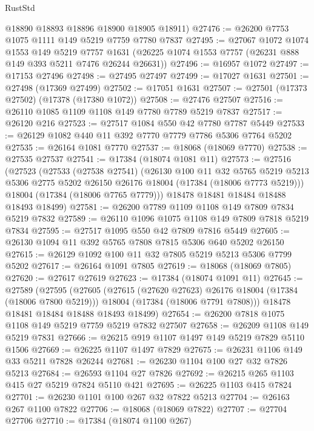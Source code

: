 \begin{lexlean}{RustStd}
\begin{coremodule}
      @18890
      @18893
      @18896
      @18900
      @18905
      @18911)
@27476 := @26200 @7753 @1075 @1111 @149 @5219 @7759 @7780 @7837
@27495 := @27067
    @1072
    @1074
    @1553
    @149
    @5219
    @7757
    @1631
    (@26225 @1074 @1553 @7757 (@26231 @888 @149 @393 @5211 @7476 @26244 @26631))
@27496 := @16957 @1072
@27497 := @17153 @27496
@27498 := @27495 @27497
@27499 := @17027 @1631
@27501 := @27498 (@17369 @27499)
@27502 := @17051 @1631
@27507 := @27501 (@17373 @27502) (@17378 (@17380 @1072))
@27508 := @27476 @27507
@27516 := @26110 @1085 @1109 @1108 @149 @7780 @7789 @5219 @7837
@27517 := @26120 @216
@27523 := @27517 @1084 @550 @42 @7780 @7787 @5449
@27533 := @26129 @1082 @440 @11 @392 @7770 @7779 @7786 @5306 @7764 @5202
@27535 := @26164 @1081 @7770
@27537 := @18068 (@18069 @7770)
@27538 := @27535 @27537
@27541 := @17384 (@18074 @1081 @11)
@27573 := @27516
    (@27523
      (@27533
        (@27538 @27541)
        (@26130
          @100
          @11
          @32
          @5765
          @5219
          @5213
          @5306
          @2775
          @5202
          @26150
          @26176
          @18004
          (@17384 (@18006 @7773 @5219)))
        @18004
        (@17384 (@18006 @7765 @7779)))
      @18478
      @18481
      @18484
      @18488
      @18493
      @18499)
@27581 := @26200 @7789 @1109 @1108 @149 @7809 @7834 @5219 @7832
@27589 := @26110 @1096 @1075 @1108 @149 @7809 @7818 @5219 @7834
@27595 := @27517 @1095 @550 @42 @7809 @7816 @5449
@27605 := @26130 @1094 @11 @392 @5765 @7808 @7815 @5306 @640 @5202 @26150
@27615 := @26129 @1092 @100 @11 @32 @7805 @5219 @5213 @5306 @7799 @5202
@27617 := @26164 @1091 @7805
@27619 := @18068 (@18069 @7805)
@27620 := @27617 @27619
@27623 := @17384 (@18074 @1091 @11)
@27645 := @27589
    (@27595
      (@27605
        (@27615 (@27620 @27623) @26176 @18004 (@17384 (@18006 @7800 @5219)))
        @18004
        (@17384 (@18006 @7791 @7808)))
      @18478
      @18481
      @18484
      @18488
      @18493
      @18499)
@27654 := @26200 @7818 @1075 @1108 @149 @5219 @7759 @5219 @7832 @27507
@27658 := @26209 @1108 @149 @5219 @7831
@27666 := @26215 @919 @1107 @1497 @149 @5219 @7829 @5110 @1506
@27669 := @26225 @1107 @1497 @7829
@27675 := @26231 @1106 @149 @33 @5211 @7828 @26244
@27681 := @26230 @1104 @100 @27 @32 @7826 @5213
@27684 := @26593 @1104 @27 @7826
@27692 := @26215 @265 @1103 @415 @27 @5219 @7824 @5110 @421
@27695 := @26225 @1103 @415 @7824
@27701 := @26230 @1101 @100 @267 @32 @7822 @5213
@27704 := @26163 @267 @1100 @7822
@27706 := @18068 (@18069 @7822)
@27707 := @27704 @27706
@27710 := @17384 (@18074 @1100 @267)

\end{coremodule}
\end{lexlean}
